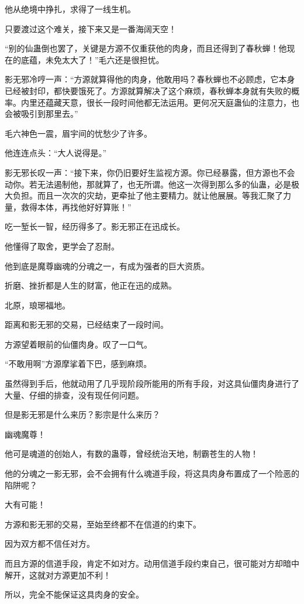 \begin{this_body}
他从绝境中挣扎，求得了一线生机。

只要渡过这个难关，接下来又是一番海阔天空！

“别的仙蛊倒也罢了，关键是方源不仅重获他的肉身，而且还得到了春秋蝉！他现在的底蕴，未免太大了！”毛六还是很担忧。

影无邪冷哼一声：“方源就算得他的肉身，他敢用吗？春秋蝉也不必顾虑，它本身已经被封印，都快要饿死了。方源就算解决了这个麻烦，春秋蝉本身就有失败的概率。内里还蕴藏天意，很长一段时间他都无法运用。更何况天庭蛊仙的注意力，也会被吸引到那里去。”

毛六神色一震，眉宇间的忧愁少了许多。

他连连点头：“大人说得是。”

影无邪长叹一声：“接下来，你仍旧要好生监视方源。你已经暴露，但方源也不会动你。若无法遏制他，那就算了，也无所谓。他这一次得到那么多的仙蛊，必是极大负担。而且一次次的灾劫，更牵扯了他主要精力。就让他展展。等我汇聚了力量，救得本体，再找他好好算账！”

吃一堑长一智，经历得多了。影无邪正在迅成长。

他懂得了取舍，更学会了忍耐。

他到底是魔尊幽魂的分魂之一，有成为强者的巨大资质。

折磨、挫折都是人生的财富，他正在迅的成熟。

北原，琅琊福地。

距离和影无邪的交易，已经结束了一段时间。

方源望着眼前的仙僵肉身。叹了一口气。

“不敢用啊”方源摩挲着下巴，感到麻烦。

虽然得到手后，他就动用了几乎现阶段所能用的所有手段，对这具仙僵肉身进行了大量、仔细的排查，没有现任何问题。

但是影无邪是什么来历？影宗是什么来历？

幽魂魔尊！

他可是魂道的创始人，有数的蛊尊，曾经统治天地，制霸苍生的人物！

他的分魂之一影无邪，会不会拥有什么魂道手段，将这具肉身布置成了一个险恶的陷阱呢？

大有可能！

方源和影无邪的交易，至始至终都不在信道的约束下。

因为双方都不信任对方。

而且方源的信道手段，肯定不如对方。动用信道手段约束自己，很可能对方却暗中解开，这就对方源更加不利！

所以，完全不能保证这具肉身的安全。


\end{this_body}
